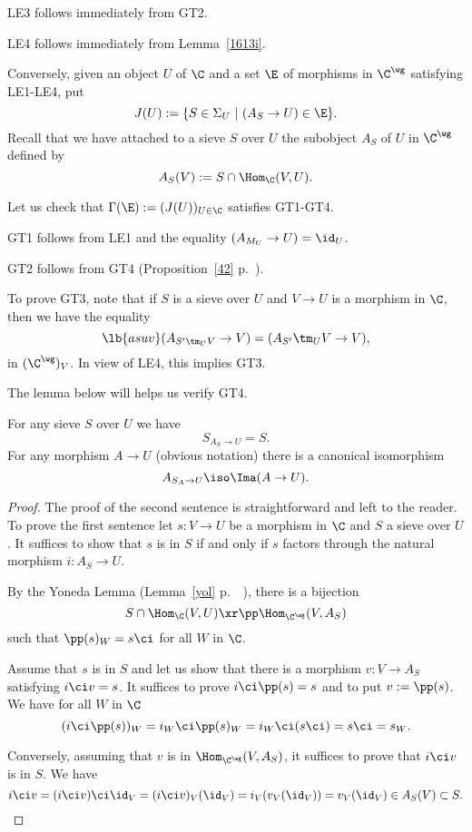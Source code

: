 \documentclass[12pt]{article}
\theoremstyle{remark}
\theoremstyle{definition}
\begin{document}
\nn LE3 follows immediately from GT2.

\nn LE4 follows immediately from Lemma~\ref{1613i}. 

Conversely, given an object $U$ of $\C$ and a set $\E$ of morphisms in $\C^\wg$ satisfying LE1-LE4, put
$$
J(U):=\{S\in\Sigma_U\ |\ (A_S\to U)\in\E\}.
$$ 
Recall that we have attached to a sieve $S$ over $U$ the subobject $A_S$ of $U$ in $\C^\wg$ defined by 
$$
A_S(V):=S\cap\Hom_\C(V,U).
$$ 

Let us check that $\Gamma(\E):=(J(U))_{U\in\C}$ satisfies GT1-GT4.

GT1 follows from LE1 and the equality $(A_{M_U}\to U)=\id_U$. 

GT2 follows from GT4 (Proposition~\ref{42} p.~\pageref{42}).

To prove GT3, note that if $S$ is a sieve over $U$ and $V\to U$ is a morphism in $\C$, then we have the equality
\begin{equation}\lb{asuv}
(A_{S'\tm_UV}\to V)=(A_{S'}\tm_UV\to V),%
\end{equation} 
in $(\C^\wg)_V$. In view of LE4, this implies GT3.

The lemma below will helps us verify GT4. 

\begin{lem}
For any sieve $S$ over $U$ we have
$$
S_{A_S\to U}=S.
$$%
For any morphism $A\to U$ (obvious notation) there is a canonical isomorphism 
$$
A_{S_A\to U}\iso\Ima(A\to U).
$$
\end{lem}

\begin{proof}
The proof of the second sentence is straightforward and left to the reader. To prove the first sentence let $s:V\to U$ be a morphism in $\C$ and $S$ a sieve over $U$. It suffices to show that $s$ is in $S$ if and only if $s$ factors through the natural morphism $i:A_S\to U$.

By the Yoneda Lemma (Lemma~\ref{yol} p.~~), there is a bijection 
$$
S\cap\Hom_\C(V,U)\xr\pp\Hom_{\C^\wg}(V,A_S)
$$
such that $\pp(s)_W=s\ci$ for all $W$ in $\C$. 

Assume that $s$ is in $S$ and let us show that there is a morphism $v:V\to A_S$ satisfying $i\ci v=s$. It suffices to prove $i\ci\pp(s)=s$ and to put $v:=\pp(s)$. We have for all $W$ in $\C$
$$
(i\ci\pp(s))_W=i_W\ci\pp(s)_W=i_W\ci(s\ci)=s\ci=s_W.
$$ 

Conversely, assuming that $v$ is in $\Hom_{\C^\wg}(V,A_S)$, it suffices to prove that $i\ci v$ is in $S$. We have 
$$
i\ci v=(i\ci v)\ci\id_V=(i\ci v)_V(\id_V)=i_V(v_V(\id_V))=v_V(\id_V)\in A_S(V)\subset S. 
$$ 
\end{proof} 
\end{document}
